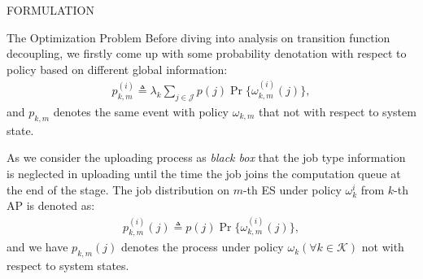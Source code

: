 \documentclass[10pt, conference, letterpaper]{IEEEtran}
\newcommand{\define}{\triangleq}
\newcommand{\apSet}{\mathcal{K}}
\newcommand{\jSet}{\mathcal{J}}
\begin{document}
\begin{section}{FORMULATION}
\begin{subsection}{The Optimization Problem}
            Before diving into analysis on transition function decoupling, we firstly come up with some probability denotation with respect to policy based on different global information:
            \begin{align}
                p^{(i)}_{k,m} \define \lambda_k \sum_{j\in\jSet} p(j) \Pr\{\omega^{(i)}_{k,m}(j)\},
            \end{align}
            and $p_{k,m}$ denotes the same event with policy $\omega_{k,m}$ that not with respect to system state.

            As we consider the uploading process as \emph{black box} that the job type information is neglected in uploading until the time the job joins the computation queue at the end of the stage. The job distribution on $m$-th ES under policy $\omega^{i}_k$ from $k$-th AP is denoted as:
            \begin{align}
                p^{(i)}_{k,m}(j) \define p(j) \Pr\{\omega^{(i)}_{k,m}(j)\},
            \end{align}
            and we have $p_{k,m}(j)$ denotes the process under policy $\omega_k (\forall k\in\apSet)$ not with respect to system states.


\end{subsection}
\end{section}
\end{document}
